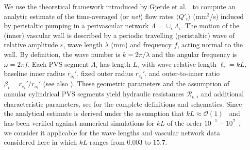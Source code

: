 \documentclass[fleqn,10pt]{wlscirep}
\begin{document}
We use the theoretical framework introduced by Gjerde et
al.~\cite{gjerde2023directional} to compute an analytic estimate of
the time-averaged (or \emph{net}) flow rates $\langle Q'_i \rangle$
(mm$^3$/s) induced by peristaltic pumping in a perivascular network
$\Lambda = \cup_i \Lambda_i$. The motion of the (inner) vascular wall
is described by a periodic travelling (peristaltic) wave of relative amplitude
$\varepsilon$, wave length $\lambda$ (mm) and frequency $f$, acting
normal to the wall. By definition, the wave number is $k = 2 \pi /
\lambda$ and the angular frequency is $\omega = 2 \pi f$. Each PVS
segment $\Lambda_i$ has length $L_i$ with wave-relative length $\ell_i
= k L$, baseline inner radius $r_{o_i}'$, fixed outer radius
$r_{e_i}'$, and outer-to-inner ratio $\beta_i = r_{e_i}'/r_{o_i}'$
(see also ). These geometric parameters and
the assumption of annular cylindrical PVS segments yield hydraulic
resistances $\mathcal{R}_{o, i}$ and additional characteristic
parameters, see \cite{gjerde2023directional} for the complete
definitions and schematics. Since the analytical estimate is derived
under the assumption that $k L \approx
\mathcal{O}(1)$~\cite{gjerde2023directional} and has been verified
against numerical simulations for $k L$ of the order
$10^{-1}-10^2$~\cite[Table I]{gjerde2023directional}, we consider it
applicable for the wave lengths and vascular network data considered
here in which $k L$ ranges from $0.003$ to $15.7$.
\end{document}
